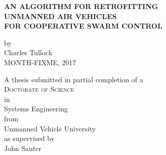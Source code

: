 \begin{titlepage}
	\begin{center}

		\vspace*{1cm}
		 
		\large{ \textbf{ \uppercase{An algorithm for retrofitting\\unmanned air vehicles\\for cooperative swarm control}}}
		
		\vspace{1.5cm}
		
		by\\
		Charles Tullock\\
		MONTH-FIXME, 2017
		
		\vspace{3cm}
		
		A thesis submitted in partial completion of a\\
		\large{\textsc{Doctorate of Science}}\\ 
		in\\
		\large{Systems Engineering}\\
		from\\
		\large{Unmanned Vehicle University}\\
		as supervised by\\
		\large{John Sauter}
		\vfill

	\end{center}
\thispagestyle{empty}
\end{titlepage}

